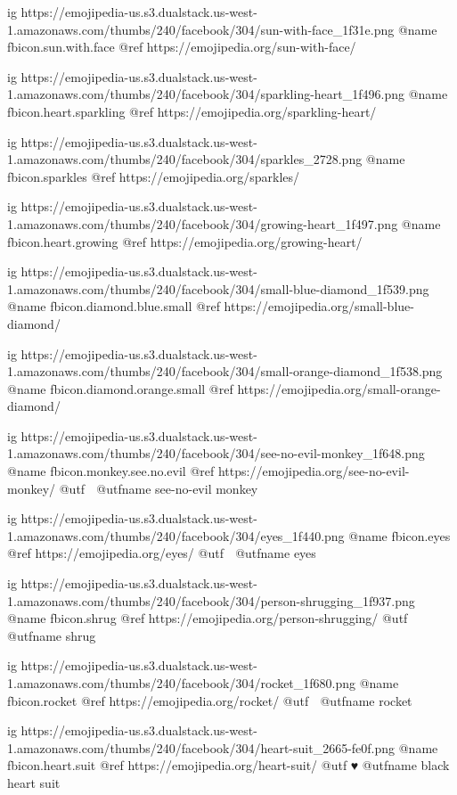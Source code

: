   ig https://emojipedia-us.s3.dualstack.us-west-1.amazonaws.com/thumbs/240/facebook/304/sun-with-face_1f31e.png
  @name fbicon.sun.with.face
  @ref https://emojipedia.org/sun-with-face/

  ig https://emojipedia-us.s3.dualstack.us-west-1.amazonaws.com/thumbs/240/facebook/304/sparkling-heart_1f496.png
  @name fbicon.heart.sparkling
  @ref https://emojipedia.org/sparkling-heart/

  ig https://emojipedia-us.s3.dualstack.us-west-1.amazonaws.com/thumbs/240/facebook/304/sparkles_2728.png
  @name fbicon.sparkles
  @ref https://emojipedia.org/sparkles/

  ig https://emojipedia-us.s3.dualstack.us-west-1.amazonaws.com/thumbs/240/facebook/304/growing-heart_1f497.png
  @name fbicon.heart.growing
  @ref https://emojipedia.org/growing-heart/

  ig https://emojipedia-us.s3.dualstack.us-west-1.amazonaws.com/thumbs/240/facebook/304/small-blue-diamond_1f539.png
  @name fbicon.diamond.blue.small
  @ref https://emojipedia.org/small-blue-diamond/

  ig https://emojipedia-us.s3.dualstack.us-west-1.amazonaws.com/thumbs/240/facebook/304/small-orange-diamond_1f538.png
  @name fbicon.diamond.orange.small
  @ref https://emojipedia.org/small-orange-diamond/

  ig https://emojipedia-us.s3.dualstack.us-west-1.amazonaws.com/thumbs/240/facebook/304/see-no-evil-monkey_1f648.png
  @name fbicon.monkey.see.no.evil
  @ref https://emojipedia.org/see-no-evil-monkey/
  @utf 🙈
  @utfname see-no-evil monkey

  ig https://emojipedia-us.s3.dualstack.us-west-1.amazonaws.com/thumbs/240/facebook/304/eyes_1f440.png
  @name fbicon.eyes
  @ref https://emojipedia.org/eyes/
  @utf 👀
  @utfname eyes

  ig https://emojipedia-us.s3.dualstack.us-west-1.amazonaws.com/thumbs/240/facebook/304/person-shrugging_1f937.png
  @name fbicon.shrug
  @ref https://emojipedia.org/person-shrugging/
  @utf 🤷
  @utfname shrug

  ig https://emojipedia-us.s3.dualstack.us-west-1.amazonaws.com/thumbs/240/facebook/304/rocket_1f680.png
  @name fbicon.rocket
  @ref https://emojipedia.org/rocket/
  @utf 🚀
  @utfname rocket

  ig https://emojipedia-us.s3.dualstack.us-west-1.amazonaws.com/thumbs/240/facebook/304/heart-suit_2665-fe0f.png
  @name fbicon.heart.suit
  @ref https://emojipedia.org/heart-suit/
  @utf ♥️
  @utfname black heart suit

